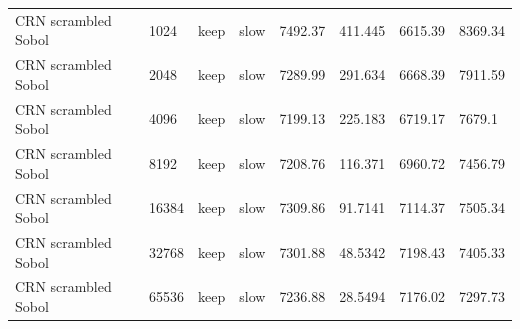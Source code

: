 \begin{tabular}{llllllll}
CRN scrambled Sobol & 1024 & keep & slow & 7492.37 & 411.445 & 6615.39 & 8369.34 \\
CRN scrambled Sobol & 2048 & keep & slow & 7289.99 & 291.634 & 6668.39 & 7911.59 \\
CRN scrambled Sobol & 4096 & keep & slow & 7199.13 & 225.183 & 6719.17 & 7679.1 \\
CRN scrambled Sobol & 8192 & keep & slow & 7208.76 & 116.371 & 6960.72 & 7456.79 \\
CRN scrambled Sobol & 16384 & keep & slow & 7309.86 & 91.7141 & 7114.37 & 7505.34 \\
CRN scrambled Sobol & 32768 & keep & slow & 7301.88 & 48.5342 & 7198.43 & 7405.33 \\
CRN scrambled Sobol & 65536 & keep & slow & 7236.88 & 28.5494 & 7176.02 & 7297.73 \\
\bottomrule
\end{tabular}
